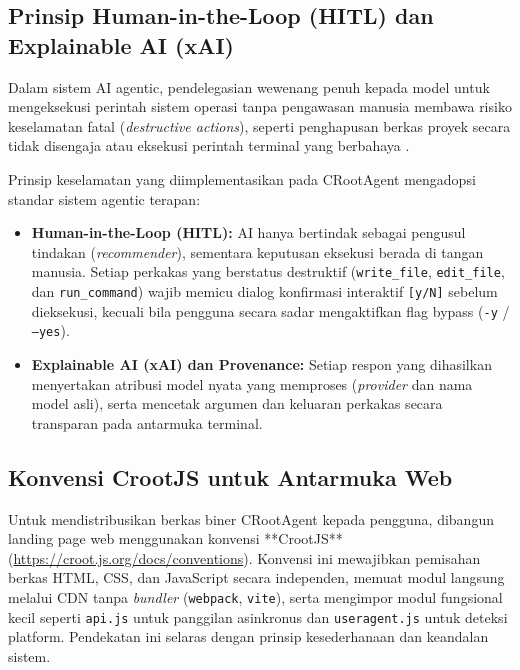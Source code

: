 \subsection{Prinsip Human-in-the-Loop (HITL) dan Explainable AI (xAI)}
Dalam sistem AI agentic, pendelegasian wewenang penuh kepada model untuk mengeksekusi perintah sistem operasi tanpa pengawasan manusia membawa risiko keselamatan fatal (\textit{destructive actions}), seperti penghapusan berkas proyek secara tidak disengaja atau eksekusi perintah terminal yang berbahaya \cite{amershi2019human}. 

Prinsip keselamatan yang diimplementasikan pada CRootAgent mengadopsi standar sistem agentic terapan:
\begin{itemize}
    \item \textbf{Human-in-the-Loop (HITL):} AI hanya bertindak sebagai pengusul tindakan (\textit{recommender}), sementara keputusan eksekusi berada di tangan manusia. Setiap perkakas yang berstatus destruktif (\texttt{write\_file}, \texttt{edit\_file}, dan \texttt{run\_command}) wajib memicu dialog konfirmasi interaktif \texttt{[y/N]} sebelum dieksekusi, kecuali bila pengguna secara sadar mengaktifkan flag bypass (\texttt{-y} / \texttt{--yes}).
    \item \textbf{Explainable AI (xAI) dan Provenance:} Setiap respon yang dihasilkan menyertakan atribusi model nyata yang memproses (\textit{provider} dan nama model asli), serta mencetak argumen dan keluaran perkakas secara transparan pada antarmuka terminal.
\end{itemize}

\subsection{Konvensi CrootJS untuk Antarmuka Web}
Untuk mendistribusikan berkas biner CRootAgent kepada pengguna, dibangun landing page web menggunakan konvensi **CrootJS** (\url{https://croot.js.org/docs/conventions}). Konvensi ini mewajibkan pemisahan berkas HTML, CSS, dan JavaScript secara independen, memuat modul langsung melalui CDN tanpa \textit{bundler} (\texttt{webpack}, \texttt{vite}), serta mengimpor modul fungsional kecil seperti \texttt{api.js} untuk panggilan asinkronus dan \texttt{useragent.js} untuk deteksi platform. Pendekatan ini selaras dengan prinsip kesederhanaan dan keandalan sistem.
